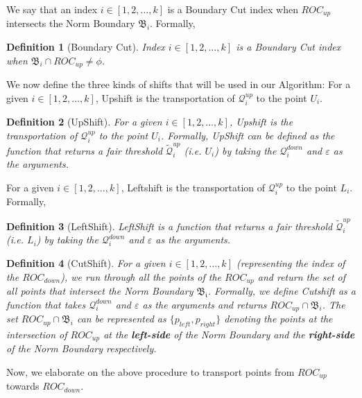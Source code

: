 \documentclass{article}
\newtheorem{definition}{Definition}[section]
\begin{document}
We say that an index $i \in [1 ,2 , \hdots, k]$ is a Boundary Cut index when $ROC_{up}$ intersects the Norm Boundary $\mathfrak{B}_i$. Formally,
\begin{definition}[Boundary Cut] \label{def:BCut}
 Index $i \in [1 ,2 , \hdots, k]$ is a \emph{Boundary Cut index} when $\mathfrak{B}_i \cap ROC_{up} \neq \phi$.
\end{definition}

We now define the three kinds of shifts that will be used in our Algorithm:
For a given $ i \in [1 , 2, \hdots ,k]$, Upshift is the transportation of $\mathcal{Q}_i^{up}$ to the point $U_i$. 
\begin{definition}[UpShift] \label{def:csh}
    For a given $ i \in [1 , 2, \hdots ,k]$, Upshift is the transportation of $\mathcal{Q}_i^{up}$ to the point $U_i$. Formally, \emph{UpShift} can be defined as the function that returns a fair threshold $\widetilde{\mathcal{Q}}_i^{up}$ (i.e. $U_i$) by taking the $\mathcal{Q}_i^{down}$ and $\varepsilon$ as the arguments.
\end{definition}

For a given $ i \in [1 , 2, \hdots ,k]$, Leftshift is the transportation of $\mathcal{Q}_i^{up}$ to the point $L_i$. Formally,
\begin{definition}[LeftShift] \label{def:csh}
LeftShift is a function that returns a fair threshold $\widetilde{\mathcal{Q}}_i^{up}$ (i.e. $L_i$) by taking the $\mathcal{Q}_i^{down}$ and $\varepsilon$ as the arguments.
\end{definition}


\begin{definition}[CutShift] \label{def:ush}
    For a given $i \in [1 , 2, \hdots ,k]$ (representing the index of the $ROC_{down}$), we run through all the points of the $ROC_{up}$ and return the set of all points that intersect the Norm Boundary $\mathfrak{B_i}$. Formally, we define \emph{Cutshift} as a function that takes $\mathcal{Q}_i^{down}$ and $\varepsilon$ as the arguments and returns $ROC_{up} \cap \mathfrak{B}_i$. The set $ROC_{up} \cap \mathfrak{B}_i$ can be represented as $\{p_{left} , p_{right}\}$ denoting the points at the intersection of $ROC_{up}$ at the \textbf{left-side} of the Norm Boundary and the \textbf{right-side} of the Norm Boundary respectively.
\end{definition}





Now, we elaborate on the above procedure to transport points from $ROC_{up}$ towards $ROC_{down}$.
\end{document}
